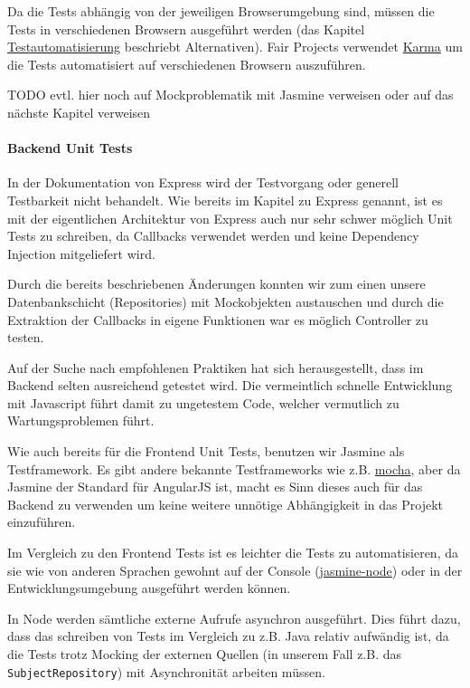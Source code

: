 Da die Tests abhängig von der jeweiligen Browserumgebung sind, müssen
die Tests in verschiedenen Browsern ausgeführt werden (das Kapitel
\url{Testautomatisierung} beschriebt Alternativen). Fair Projects
verwendet \href{http://karma-runner.github.io/0.13/index.html}{Karma} um
die Tests automatisiert auf verschiedenen Browsern auszuführen.

TODO evtl. hier noch auf Mockproblematik mit Jasmine verweisen oder auf
das nächste Kapitel verweisen

\paragraph{Backend Unit Tests}\label{backend-unit-tests}

In der Dokumentation von Express wird der Testvorgang oder generell
Testbarkeit nicht behandelt. Wie bereits im Kapitel zu Express genannt,
ist es mit der eigentlichen Architektur von Express auch nur sehr schwer
möglich Unit Tests zu schreiben, da Callbacks verwendet werden und keine
Dependency Injection mitgeliefert wird.

Durch die bereits beschriebenen Änderungen konnten wir zum einen unsere
Datenbankschicht (Repositories) mit Mockobjekten austauschen und durch
die Extraktion der Callbacks in eigene Funktionen war es möglich
Controller zu testen.

Auf der Suche nach empfohlenen Praktiken hat sich herausgestellt, dass
im Backend selten ausreichend getestet wird. Die vermeintlich schnelle
Entwicklung mit Javascript führt damit zu ungetestem Code, welcher
vermutlich zu Wartungsproblemen führt.

Wie auch bereits für die Frontend Unit Tests, benutzen wir Jasmine als
Testframework. Es gibt andere bekannte Testframeworks wie z.B.
\href{https://mochajs.org/}{mocha}, aber da Jasmine der Standard für
AngularJS ist, macht es Sinn dieses auch für das Backend zu verwenden um
keine weitere unnötige Abhängigkeit in das Projekt einzuführen.

Im Vergleich zu den Frontend Tests ist es leichter die Tests zu
automatisieren, da sie wie von anderen Sprachen gewohnt auf der Console
(\href{https://github.com/mhevery/jasmine-node}{jasmine-node}) oder in
der Entwicklungsumgebung ausgeführt werden können.

In Node werden sämtliche externe Aufrufe asynchron ausgeführt. Dies
führt dazu, dass das schreiben von Tests im Vergleich zu z.B. Java
relativ aufwändig ist, da die Tests trotz Mocking der externen Quellen
(in unserem Fall z.B. das \texttt{SubjectRepository}) mit Asynchronität
arbeiten müssen.

